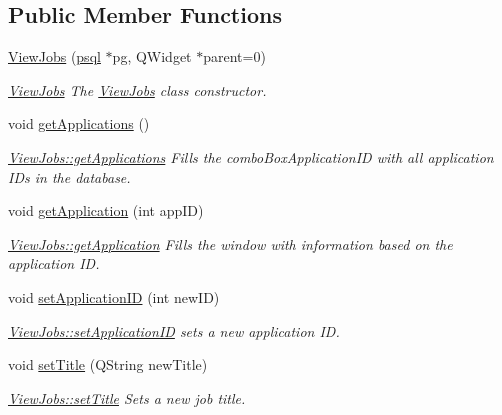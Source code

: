 \subsection*{Public Member Functions}
\begin{DoxyCompactItemize}
\item 
\hyperlink{class_view_jobs_a25c5a4f3fa92331821579b60d47185fc}{View\+Jobs} (\hyperlink{classpsql}{psql} $\ast$pg, Q\+Widget $\ast$parent=0)
\begin{DoxyCompactList}\small\item\em \hyperlink{class_view_jobs}{View\+Jobs} The \hyperlink{class_view_jobs}{View\+Jobs} class constructor. \end{DoxyCompactList}\item 
\mbox{\label{class_view_jobs_af97593f0db01caee0febfe774a823e9c}} 
void \hyperlink{class_view_jobs_af97593f0db01caee0febfe774a823e9c}{get\+Applications} ()
\begin{DoxyCompactList}\small\item\em \hyperlink{class_view_jobs_af97593f0db01caee0febfe774a823e9c}{View\+Jobs\+::get\+Applications} Fills the combo\+Box\+Application\+ID with all application I\+Ds in the database. \end{DoxyCompactList}\item 
void \hyperlink{class_view_jobs_ae9c1c806aa1dd5082b38a1dc9cbec39e}{get\+Application} (int app\+ID)
\begin{DoxyCompactList}\small\item\em \hyperlink{class_view_jobs_ae9c1c806aa1dd5082b38a1dc9cbec39e}{View\+Jobs\+::get\+Application} Fills the window with information based on the application ID. \end{DoxyCompactList}\item 
void \hyperlink{class_view_jobs_acd43a8c32ab9bca7e40ecc99e51da9b8}{set\+Application\+ID} (int new\+ID)
\begin{DoxyCompactList}\small\item\em \hyperlink{class_view_jobs_acd43a8c32ab9bca7e40ecc99e51da9b8}{View\+Jobs\+::set\+Application\+ID} sets a new application ID. \end{DoxyCompactList}\item 
void \hyperlink{class_view_jobs_abfe1969197cde57ea049c1b7d91cd4f5}{set\+Title} (Q\+String new\+Title)
\begin{DoxyCompactList}\small\item\em \hyperlink{class_view_jobs_abfe1969197cde57ea049c1b7d91cd4f5}{View\+Jobs\+::set\+Title} Sets a new job title. \end{DoxyCompactList}\item 

\end{DoxyCompactItemize}
